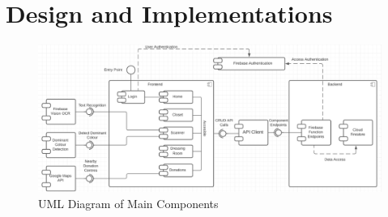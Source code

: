\documentclass[a4paper, 11pt]{article}
\begin{document}
  \section{Design and Implementations}
    \begin{figure}[!htbp]
      \centering
      \includegraphics[width=\textwidth]{component-overview.png}
      \caption{UML Diagram of Main Components}
    \end{figure}
\end{document}
